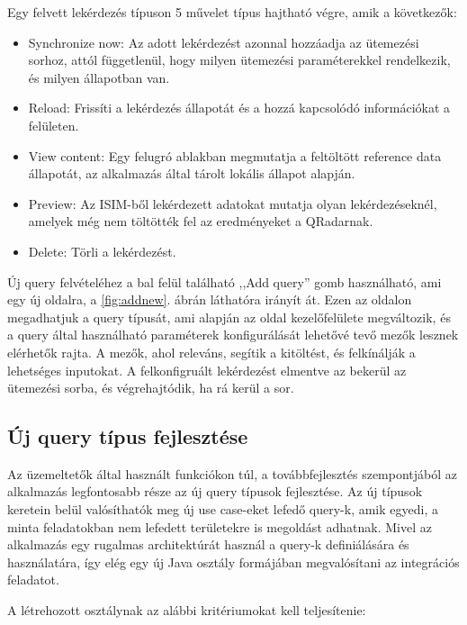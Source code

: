 Egy felvett lekérdezés típuson 5 művelet típus hajtható végre, amik a következők:
\begin{itemize}
	\item Synchronize now: Az adott lekérdezést azonnal hozzáadja az ütemezési sorhoz, attól függetlenül, hogy milyen ütemezési paraméterekkel rendelkezik, és milyen állapotban van.
	\item Reload: Frissíti a lekérdezés állapotát és a hozzá kapcsolódó információkat a felületen.
	\item View content: Egy felugró ablakban megmutatja a feltöltött reference data állapotát, az alkalmazás által tárolt lokális állapot alapján.
	\item Preview: Az ISIM-ből lekérdezett adatokat mutatja olyan lekérdezéseknél, amelyek még nem töltötték fel az eredményeket a QRadarnak.
	\item Delete: Törli a lekérdezést.
\end{itemize}

Új query felvételéhez a bal felül található ,,Add query'' gomb használható, ami egy új oldalra, a \ref{fig:addnew}. ábrán láthatóra irányít át. Ezen az oldalon megadhatjuk a query típusát, ami alapján az oldal kezelőfelülete megváltozik, és a query által használható paraméterek konfigurálását lehetővé tevő mezők lesznek elérhetők rajta. A mezők, ahol releváns, segítik a kitöltést, és felkínálják a lehetséges inputokat. A felkonfigruált lekérdezést elmentve az bekerül az ütemezési sorba, és végrehajtódik, ha rá kerül a sor.



\subsection{Új query típus fejlesztése}

Az üzemeltetők által használt funkciókon túl, a továbbfejlesztés szempontjából az alkalmazás legfontosabb része az új query típusok fejlesztése. Az új típusok keretein belül valósíthatók meg új use case-eket lefedő query-k, amik egyedi, a minta feladatokban nem lefedett területekre is megoldást adhatnak. Mivel az alkalmazás egy rugalmas architektúrát használ a query-k definiálására és használatára, így elég egy új Java osztály formájában megvalósítani az integrációs feladatot.

A létrehozott osztálynak az alábbi kritériumokat kell teljesítenie:

